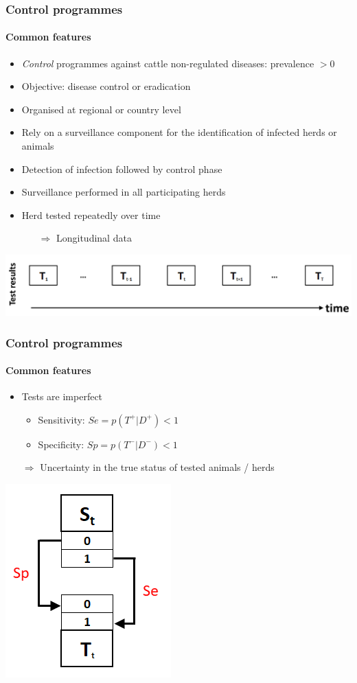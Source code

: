 \documentclass{beamer}
\begin{document}
\begin{frame}
\frametitle{Control programmes}
\framesubtitle{Common features}
\begin{itemize}
 \item{\emph{Control} programmes against cattle non-regulated diseases: prevalence $>0$}
 \item{Objective: disease control or eradication}
 \item{Organised at regional or country level}
 \item{Rely on a surveillance component for the identification of infected herds or animals}
 \item{Detection of infection followed by control phase}
 \item{Surveillance performed in all participating herds}
 \item{Herd tested repeatedly over time}
  \begin{itemize}
   \item[$\Rightarrow$]{Longitudinal data}
  \end{itemize}
\end{itemize}
\includegraphics[width=\textwidth]{imgs/longitudinal_data.png}
\end{frame}

\begin{frame}
\frametitle{Control programmes}
\framesubtitle{Common features}
\begin{itemize}
 \item{Tests are imperfect}
 \begin{itemize}
  \item{Sensitivity: $Se = p(T^+|D^+) < 1$}
  \item{Specificity: $Sp = p(T^-|D^-) < 1$}
 \end{itemize}
 \item[$\Rightarrow$]{Uncertainty in the true status of tested animals / herds}
\end{itemize}
\center
\includegraphics[width=.3\textwidth]{imgs/SeSp.png}
\end{frame}
\end{document}
